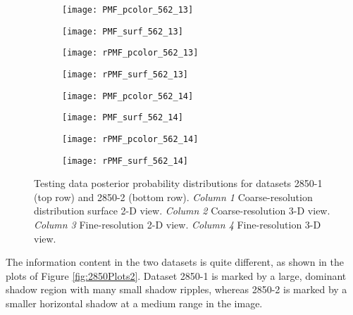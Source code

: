 \begin{figure} [h!]	
  	\centering
	\begin{subfigure}[b]{0.24\textwidth}
                \texttt{[image: PMF\_pcolor\_562\_13]}
		\caption{}
  	\end{subfigure}
  	\centering
	\begin{subfigure}[b]{0.24\textwidth}
                \texttt{[image: PMF\_surf\_562\_13]}
		\caption{}
  	\end{subfigure}
  	\centering
	\begin{subfigure}[b]{0.24\textwidth}
                \texttt{[image: rPMF\_pcolor\_562\_13]}
		\caption{}
  	\end{subfigure}
  	\centering
	\begin{subfigure}[b]{0.24\textwidth}
                \texttt{[image: rPMF\_surf\_562\_13]}
		\caption{}
  	\end{subfigure}
  		  	
  	\centering
	\begin{subfigure}[b]{0.24\textwidth}
                \texttt{[image: PMF\_pcolor\_562\_14]}
		\caption{}
  	\end{subfigure}
  	\centering
	\begin{subfigure}[b]{0.24\textwidth}
                \texttt{[image: PMF\_surf\_562\_14]}
		\caption{}
  	\end{subfigure}
  	\centering
	\begin{subfigure}[b]{0.24\textwidth}
                \texttt{[image: rPMF\_pcolor\_562\_14]}
		\caption{}
  	\end{subfigure}
  	\centering
	\begin{subfigure}[b]{0.24\textwidth}
                \texttt{[image: rPMF\_surf\_562\_14]}
		\caption{}
  	\end{subfigure}
  	
	\caption{Testing data posterior probability distributions for datasets 2850-1 (top row) and 2850-2 (bottom row). \emph{Column 1} Coarse-resolution distribution surface 2-D view. \emph{Column 2} Coarse-resolution 3-D view. \emph{Column 3} Fine-resolution 2-D view. \emph{Column 4} Fine-resolution 3-D view. }
	\label{fig:2850Distributions2}
\end{figure}

The information content in the two datasets is quite different, as shown in the plots of Figure \ref{fig:2850Plots2}. Dataset 2850-1 is marked by a large, dominant shadow region with many small shadow ripples, whereas 2850-2 is marked by a smaller horizontal shadow at a medium range in the image.


